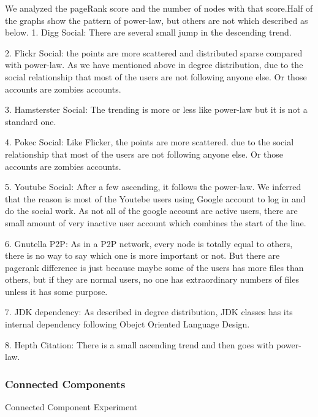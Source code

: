 We analyzed the pageRank score and the number of nodes with that score.Half of the graphs show the pattern of power-law, but others are not which described as below.
1. Digg Social: There are several small jump in the descending trend.

2. Flickr Social: the points are more scattered and distributed sparse compared with power-law. As we have mentioned above in degree distribution, due to the social relationship that most of the users are not following anyone else. Or those accounts are zombies accounts.

3. Hamsterster Social: The trending is more or less like power-law but it is not a standard one.

4. Pokec Social: Like Flicker, the points are more scattered. due to the social relationship that most of the users are not following anyone else. Or those accounts are zombies accounts.

5. Youtube Social: After a few ascending, it follows the power-law. We inferred that the reason is most of the Youtebe users using Google account to log in and do the social work. As not all of the google account are active users, there are small amount of very inactive user account which combines the start of the line.

6. Gnutella P2P: As in a P2P network, every node is totally equal to others, there is no way to say which one is more important or not. But there are pagerank difference is just because maybe some of the users has more files than others, but if they are normal users, no one has extraordinary numbers of files unless it has some purpose.

7. JDK dependency: As described in degree distribution, JDK classes has its internal dependency following Obejct Oriented Language Design.

8. Hepth Citation: There is a small ascending trend and then goes with power-law. 

\subsubsection{Connected Components}
Connected Component Experiment

